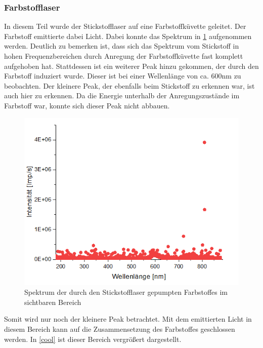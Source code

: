 \documentclass[
	a4paper,
	12pt,
	pagesize,
	ngerman
]{scrartcl}
\begin{document}
\subsubsection{Farbstofflaser}
In diesem Teil wurde der Stickstofflaser auf eine Farbstoffküvette geleitet. Der Farbstoff emittierte dabei Licht. Dabei konnte das Spektrum in \cref{Farbstoff} aufgenommen werden. Deutlich zu bemerken ist, dass sich das Spektrum vom Stickstoff in hohen Frequenzbereichen durch Anregung der Farbstoffküvette fast komplett aufgehoben hat. Stattdessen ist ein weiterer Peak hinzu gekommen, der durch den Farbstoff induziert wurde. Dieser ist bei einer Wellenlänge von ca. 600nm zu beobachten. Der kleinere Peak, der ebenfalls beim Stickstoff zu erkennen war, ist auch hier zu erkennen. Da die Energie unterhalb der Anregungszustände im Farbstoff war, konnte sich dieser Peak nicht abbauen. 
\begin{figure}[h!]
	\centering
	\includegraphics[scale = 1.5]{peak.png}
	\caption{Spektrum der durch den Stickstofflaser gepumpten Farbstoffes im sichtbaren Bereich}
	\label{Farbstoff}
\end{figure}
Somit wird nur noch der kleinere Peak betrachtet. Mit dem emittierten Licht in diesem Bereich kann auf die Zusammensetzung des Farbstoffes geschlossen werden. In \cref{cool} ist dieser Bereich vergrößert dargestellt.
\end{document}
